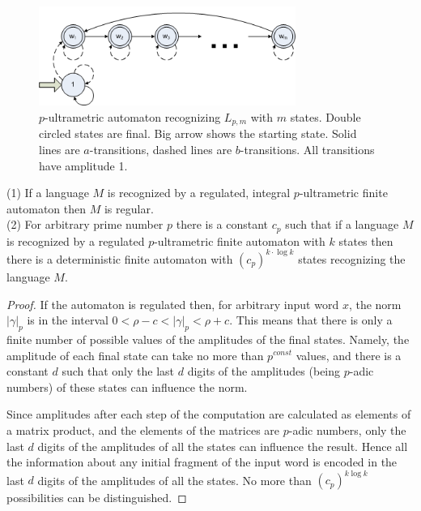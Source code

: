 \documentclass{llncs}
\begin{document}
\begin{figure}[H]
  \centering
  \includegraphics[width = 8.4cm]{autom_m1.png}
  \caption{$p$-ultrametric automaton recognizing $L_{p,m}$ with $m$ states.
  Double circled states are final.
  Big arrow shows the starting state.
  Solid lines are $a$-transitions, dashed lines are $b$-transitions.
  All transitions have amplitude 1. }
  \label{autom2}
\end{figure}


\begin{theorem}
(1) If a language $M$ is recognized by a regulated, integral $p$-ultrametric finite automaton then $M$ is regular.\\
(2) For arbitrary prime number $p$ there is a constant $c_p$ such that if a language $M$ is recognized by a regulated $p$-ultrametric finite automaton with $k$ states then there is a deterministic finite automaton with $(c_p)^{k\cdot \log k}$ states recognizing the language $M$.
\end{theorem}
\begin{proof}
If the automaton is regulated then, for arbitrary input word $x$, the norm  $|\gamma |_p$ is in the interval $0 < \rho -c < |\gamma |_p < \rho +c$. This means that there is only a finite number of possible values of the amplitudes of the final states. Namely, the amplitude of each final state can take no more than $p^{const}$ values, and there is a constant $d$ such that only the last $d$ digits of the amplitudes (being $p$-adic numbers) of these states can influence  the norm.

Since amplitudes after each step of the computation are calculated as elements of a matrix product, and the elements of the matrices are $p$-adic numbers, only the last $d$ digits of the amplitudes of all the states can influence the result. Hence all the information about any initial fragment of the input word is encoded in the last $d$ digits of the amplitudes of all the states. No more than $(c_p)^{k\log k}$ possibilities can be distinguished.
\end{proof}
\end{document}
